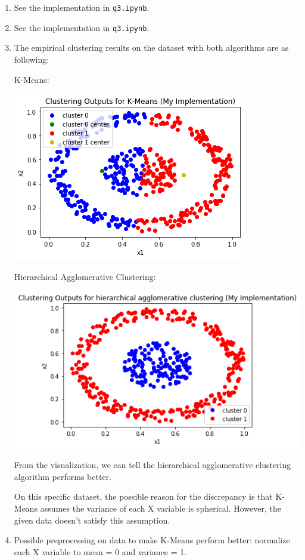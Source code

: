 \documentclass[paper=letter, fontsize=12pt]{article}
\begin{document}
\begin{enumerate}[label=(\alph*)]
	\item See the implementation in \verb|q3.ipynb|.
	
	\item See the implementation in \verb|q3.ipynb|.
	
	\item The empirical clustering results on the dataset with both algorithms are as following:
	
	K-Means:
	
	\includegraphics[scale=0.6]{q3c1.png}
	
	Hierarchical Agglomerative Clustering:
	
	\includegraphics[scale=0.6]{q3c2.png}
	
	From the visualization, we can tell the hierarchical agglomerative clustering algorithm performs better. 
	
	On this specific dataset, the possible reason for the discrepancy is that K-Means assumes the variance of each X variable is spherical. However, the given data doesn't satisfy this assumption. 
	
	\item Possible preprocessing on data to make K-Means perform better: normalize each X variable to mean = 0 and variance = 1.
\end{enumerate}
\end{document}
